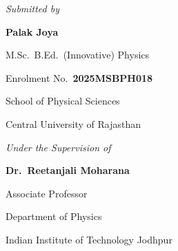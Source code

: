 \documentclass[12pt]{article}
\let\titlefontbold\titlefont
\begin{document}
\begin{center}
  \vspace{0.50cm}

  \begin{minipage}{\textwidth}
    \begin{minipage}[t]{0.44\textwidth}\centering
      {\titlefont\itshape\fontsize{12}{15}\selectfont\color{Gold}Submitted by\par}
      \vspace{0.08cm}
      {\titlefontbold\bfseries\fontsize{15}{18}\selectfont\color{PrimaryNavy}Palak Joya\par}
      \vspace{0.05cm}
      {\fontsize{10.5}{13}\selectfont\color{TextNavy}
         M.Sc.\ B.Ed.\ (Innovative) Physics\par}
      {\fontsize{10}{13}\selectfont\color{TextNavy}
         Enrolment No.\ \textbf{2025MSBPH018}\par}
      {\fontsize{10}{13}\selectfont\color{TextNavy}School of Physical Sciences\par}
      {\fontsize{10}{13}\selectfont\color{TextNavy}Central University of Rajasthan\par}
    \end{minipage}%
    \hfill
    \hfill
    \begin{minipage}[t]{0.44\textwidth}\centering
      {\titlefont\itshape\fontsize{12}{15}\selectfont\color{Gold}Under the Supervision of\par}
      \vspace{0.08cm}
      {\titlefontbold\bfseries\fontsize{15}{18}\selectfont\color{PrimaryNavy}
         Dr.\ Reetanjali Moharana\par}
      \vspace{0.05cm}
      {\fontsize{10.5}{13}\selectfont\color{TextNavy}Associate Professor\par}
      {\fontsize{10}{13}\selectfont\color{TextNavy}Department of Physics\par}
      {\fontsize{10}{13}\selectfont\color{TextNavy}
         Indian Institute of Technology Jodhpur\par}
    \end{minipage}%
  \end{minipage}


\end{center}
\end{document}
